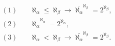 \begin{align*}
(1)&\quad \aleph_\alpha \leq \aleph_\beta \rightarrow \overline{\aleph_\alpha}^{\aleph_\beta} = 2^{\aleph_\beta},\\
(2)&\quad \overline{\aleph_\alpha}^{\aleph_\alpha} = 2^{\aleph_\alpha},\\
(3)&\quad \aleph_\alpha < \aleph_\beta \rightarrow \overline{\aleph_\alpha}^{\aleph_\beta} = 2^{\aleph_\beta}.
\end{align*}